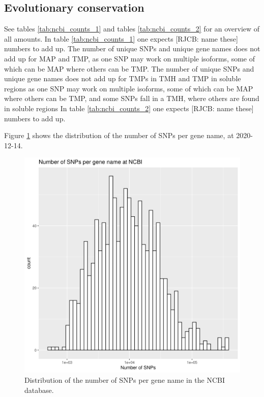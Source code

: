 \subsection{Evolutionary conservation}

See tables \ref{tab:ncbi_counts_1} and tables \ref{tab:ncbi_counts_2}
for an overview of all amounts.
In table \ref{tab:ncbi_counts_1} one expects [RJCB: name these]
numbers to add up. 
The number of unique SNPs and unique gene names
does not add up for MAP and TMP,
as one SNP may work on multiple isoforms, some of which can be MAP
where others can be TMP.
The number of unique SNPs and unique gene names
does not add up for TMPs in TMH and TMP in soluble regions
as one SNP may work on multiple isoforms, some of which can be MAP
where others can be TMP, and some SNPs fall in a TMH, where others
are found in soluble regions
In table \ref{tab:ncbi_counts_2} one expects [RJCB: name these]
numbers to add up. 






Figure \ref{fig:snps_per_gene_name_ncbi} shows the distribution of the
number of SNPs per gene name, at 2020-12-14.

\begin{figure}[!htbp]
  \includegraphics[width=\textwidth]{ncbi_peregrine_results/fig_snps_per_gene_name_ncbi.png}
  \caption{
    Distribution of the number of SNPs per gene name in the NCBI database.
  }
  \label{fig:snps_per_gene_name_ncbi}
\end{figure}

